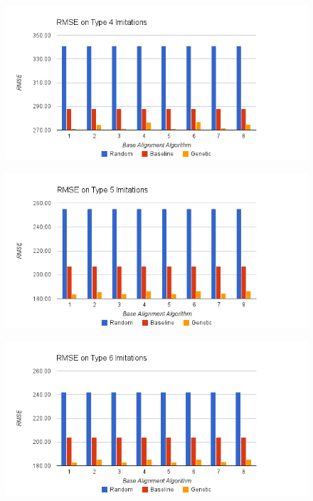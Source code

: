 \begin{figure}[center]
	\centering
	\includegraphics[width=16cm]{images/chart2.png}
	\caption{}
	\label{fig:c4}
\end{figure}
\begin{figure}[center]
	\centering
	\includegraphics[width=16cm]{images/chart7.png}
	\caption{}
	\label{fig:c5}
\end{figure}
\begin{figure}[center]
	\centering
	\includegraphics[width=16cm]{images/chart6.png}
	\caption{}
	\label{fig:c6}
\end{figure}

